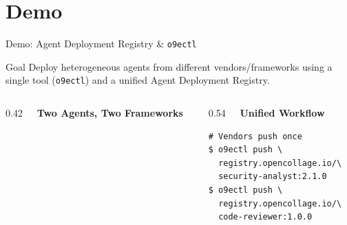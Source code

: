 \section{Demo}

\begin{frame}[fragile]{Demo: Agent Deployment Registry \& \texttt{o9ectl}}
  \vspace{-0.2cm}
  \scriptsize
  \begin{block}{Goal}
    \scriptsize
    Deploy heterogeneous agents from different vendors/frameworks using a single
    tool (\texttt{o9ectl}) and a unified Agent Deployment Registry.
  \end{block}

  \vspace{-0.1cm}

  \begin{columns}[T]
    \begin{column}{0.42\textwidth}
      \textbf{\ \ Two Agents, Two Frameworks}
      \vspace{0.1cm}

      \begin{center}
      \end{center}
    \end{column}
    \begin{column}{0.54\textwidth}
      \textbf{\ \ Unified Workflow}
      \vspace{0.1cm}
      \begin{lstlisting}
# Vendors push once
$ o9ectl push \
  registry.opencollage.io/\
  security-analyst:2.1.0
$ o9ectl push \
  registry.opencollage.io/\
  code-reviewer:1.0.0


\end{lstlisting}
\end{column}
\end{columns}
\end{frame}
